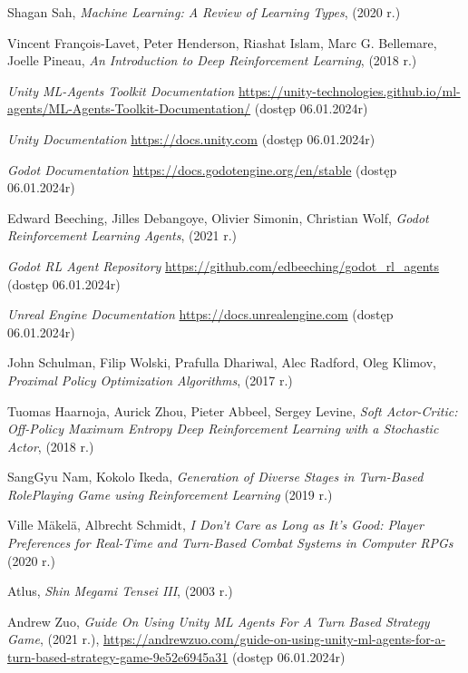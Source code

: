 \documentclass{SGGW-thesis}
\begin{document}
\begin{thebibliography}{9}
  Shagan Sah,
  \textit{Machine Learning: A Review of Learning Types},
  (2020 r.)

  Vincent François-Lavet, Peter Henderson, Riashat Islam, Marc G. Bellemare, Joelle Pineau,
  \textit{An Introduction to Deep Reinforcement Learning},
  (2018 r.)

  \textit{Unity ML-Agents Toolkit Documentation} 
  \url{https://unity-technologies.github.io/ml-agents/ML-Agents-Toolkit-Documentation/}
  (dostęp 06.01.2024r)

  \textit{Unity Documentation}
  \url{https://docs.unity.com}
  (dostęp 06.01.2024r)

  \textit{Godot Documentation}
  \url{https://docs.godotengine.org/en/stable}
  (dostęp 06.01.2024r)

  Edward Beeching, Jilles Debangoye, Olivier Simonin, Christian Wolf,
  \textit{Godot Reinforcement Learning Agents},
  (2021 r.)

  \textit{Godot RL Agent Repository}
  \url{https://github.com/edbeeching/godot_rl_agents}
  (dostęp 06.01.2024r)

  \textit{Unreal Engine Documentation}
  \url{https://docs.unrealengine.com}
  (dostęp 06.01.2024r)
  
  John Schulman, Filip Wolski, Prafulla Dhariwal, Alec Radford, Oleg Klimov, 
  \textit{Proximal Policy Optimization Algorithms},
  (2017 r.)

  Tuomas Haarnoja, Aurick Zhou, Pieter Abbeel, Sergey Levine, 
  \textit{Soft Actor-Critic: Off-Policy Maximum Entropy Deep Reinforcement Learning with a Stochastic Actor},
  (2018 r.)

  SangGyu Nam, Kokolo Ikeda,
  \textit{Generation of Diverse Stages in Turn-Based RolePlaying Game using Reinforcement Learning}
  (2019 r.)

  Ville Mäkelä, Albrecht Schmidt,
  \textit{I Don’t Care as Long as It’s Good: Player Preferences for
  Real-Time and Turn-Based Combat Systems in Computer RPGs}
  (2020 r.)

  Atlus,
  \textit{Shin Megami Tensei III},
  (2003 r.)

  Andrew Zuo,
  \textit{Guide On Using Unity ML Agents For A Turn Based Strategy Game},
  (2021 r.),
  \url{https://andrewzuo.com/guide-on-using-unity-ml-agents-for-a-turn-based-strategy-game-9e52e6945a31} 
  (dostęp 06.01.2024r)
\end{thebibliography}

\beforelastpage
\end{document}
